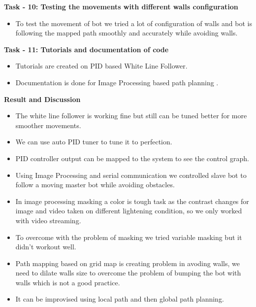 \documentclass[report]{res}
\begin{document}
	{\Large \textbf{Task - 10: Testing the movements with different walls configuration}} \\
	
	\begin{itemize}
			
		\item To test the movement of bot we tried a lot of configuration of walls and bot is following the mapped path smoothly and accurately while avoiding walls. \\

	\end{itemize}
	
	{\Large \textbf{Task - 11: Tutorials and documentation of code}} \\

	\begin{itemize}
		
		\item Tutorials are created on PID based White Line Follower.
		\item Documentation is done for Image Processing based path planning  .
	
	\end{itemize}
	
	\pagebreak
	
	
	\begin{center}
		{\huge\textbf{Result and Discussion}\par}
	\end{center}
	
	\begin{itemize}
		
		\item The white line follower is working fine but still can be tuned better for more smoother movements.
		\item We can use auto PID tuner to tune it to perfection. 
		\item PID controller output can be mapped to the system to see the control graph. 
		\item Using Image Processing and serial communication we controlled slave bot to follow a moving master bot while avoiding obstacles. 
		\item In image processing masking a color is tough task as the contrast changes for image and video taken on different lightening condition, so we only worked with video streaming. 
		\item To overcome with the problem of masking we tried variable masking but it didn't workout well. 
		\item Path mapping based on grid map is creating problem in avoding walls, we need to dilate walls size to overcome the problem of bumping the bot with walls which is not a good practice. 
		\item It can be improvised using local path and then global path planning.
		
	\end{itemize}
	
\end{document}
